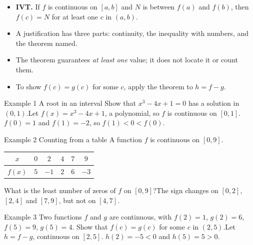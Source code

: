 \documentclass[11pt]{article}
\begin{document}

\begin{ideabox}
\begin{itemize}[leftmargin=*,itemsep=2pt,topsep=2pt]
  \item \textbf{IVT.} If $f$ is continuous on $[a,b]$ and $N$ is between $f(a)$ and $f(b)$, then $f(c)=N$ for at least one $c$ in $(a,b)$.
  \item A justification has three parts: continuity, the inequality with numbers, and the theorem named.
  \item The theorem guarantees \emph{at least one} value; it does not locate it or count them.
  \item To show $f(c)=g(c)$ for some $c$, apply the theorem to $h=f-g$.
\end{itemize}
\end{ideabox}

\begin{example}{Example 1 \textperiodcentered{} A root in an interval}
Show that $x^3-4x+1=0$ has a solution in $(0,1)$.\soln Let $f(x)=x^3-4x+1$, a polynomial, so $f$ is continuous on $[0,1]$. $f(0)=1$ and $f(1)=-2$, so $f(1)<0<f(0)$.
\end{example}

\begin{example}{Example 2 \textperiodcentered{} Counting from a table}
A function $f$ is continuous on $[0,9]$.\begin{center}\renewcommand{\arraystretch}{1.25}\begin{tabular}{|c|c|c|c|c|c|}\hline $x$ & $0$ & $2$ & $4$ & $7$ & $9$ \\ \hline $f(x)$ & $5$ & $-1$ & $2$ & $6$ & $-3$ \\ \hline\end{tabular}\end{center}What is the least number of zeros of $f$ on $[0,9]$?\soln The sign changes on $[0,2]$, $[2,4]$ and $[7,9]$, but not on $[4,7]$.
\end{example}

\begin{example}{Example 3 \textperiodcentered{} Two functions}
$f$ and $g$ are continuous, with $f(2)=1$, $g(2)=6$, $f(5)=9$, $g(5)=4$. Show that $f(c)=g(c)$ for some $c$ in $(2,5)$.\soln Let $h=f-g$, continuous on $[2,5]$. $h(2)=-5<0$ and $h(5)=5>0$.
\end{example}
\end{document}
